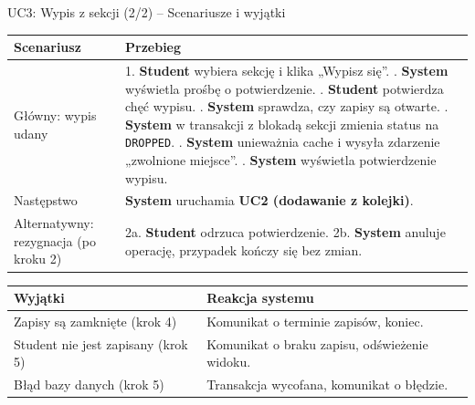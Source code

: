 \documentclass[aspectratio=169, 10pt, xcolor=table]{beamer}
\renewcommand{\arraystretch}{1.18}
\begin{document}
\begin{frame}{UC3: Wypis z sekcji (2/2) -- Scenariusze i wyjątki}
    \scriptsize
    \renewcommand{\arraystretch}{1.12}
    \begin{tabularx}{\textwidth}{|U{3.5cm}|Y|}
        \hline
        \textcolor{NavyPrimary}{\textbf{Scenariusz}} & \textcolor{NavyPrimary}{\textbf{Przebieg}} \\
        \hline
        Główny: wypis udany &
        1. \textbf{Student} wybiera sekcję i klika „Wypisz się”. . \textbf{System} wyświetla prośbę o potwierdzenie. . \textbf{Student} potwierdza chęć wypisu. . \textbf{System} sprawdza, czy zapisy są otwarte. . \textbf{System} w transakcji z blokadą sekcji zmienia status na \texttt{DROPPED}. . \textbf{System} unieważnia cache i wysyła zdarzenie „zwolnione miejsce”. . \textbf{System} wyświetla potwierdzenie wypisu. \\
        \hline
        Następstwo & \textbf{System} uruchamia \textbf{UC2 (dodawanie z kolejki)}. \\
        \hline
        Alternatywny: rezygnacja (po kroku 2) &
        2a. \textbf{Student} odrzuca potwierdzenie. \newline
        2b. \textbf{System} anuluje operację, przypadek kończy się bez zmian. \\
        \hline
    \end{tabularx}

    \vspace{4pt}
    \begin{tabularx}{\textwidth}{|U{4.3cm}|Y|}
        \hline
        \textcolor{NavyPrimary}{\textbf{Wyjątki}} & \textcolor{NavyPrimary}{\textbf{Reakcja systemu}} \\
        \hline
        Zapisy są zamknięte (krok 4) & Komunikat o terminie zapisów, koniec. \\
        \hline
        Student nie jest zapisany (krok 5) & Komunikat o braku zapisu, odświeżenie widoku. \\
        \hline
        Błąd bazy danych (krok 5) & Transakcja wycofana, komunikat o błędzie. \\
        \hline
    \end{tabularx}
\end{frame}
\end{document}
